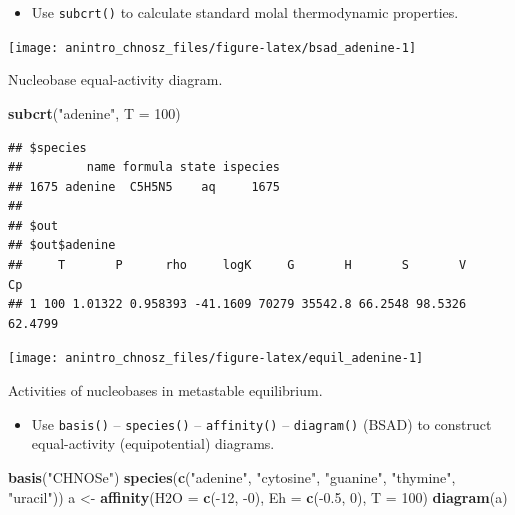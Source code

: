 \documentclass[]{tufte-book}
\newenvironment{Shaded}{}{}
\newcommand{\KeywordTok}[1]{\textcolor[rgb]{0.00,0.44,0.13}{\textbf{#1}}}
\newcommand{\DataTypeTok}[1]{\textcolor[rgb]{0.56,0.13,0.00}{#1}}
\newcommand{\DecValTok}[1]{\textcolor[rgb]{0.25,0.63,0.44}{#1}}
\newcommand{\FloatTok}[1]{\textcolor[rgb]{0.25,0.63,0.44}{#1}}
\newcommand{\StringTok}[1]{\textcolor[rgb]{0.25,0.44,0.63}{#1}}
\newcommand{\OperatorTok}[1]{\textcolor[rgb]{0.40,0.40,0.40}{#1}}
\newcommand{\NormalTok}[1]{#1}
\providecommand{\tightlist}{%
  \setlength{\itemsep}{0pt}\setlength{\parskip}{0pt}}
\begin{document}
\begin{itemize}
\tightlist
\item
  Use {\texttt{subcrt()}} to calculate standard molal thermodynamic
  properties.
\end{itemize}

\begin{marginfigure}
\texttt{[image: anintro\_chnosz\_files/figure-latex/bsad\_adenine-1]} \caption[Nucleobase equal-activity diagram]{Nucleobase equal-activity diagram.}\label{fig:bsad_adenine}
\end{marginfigure}

\begin{Shaded}
\begin{Highlighting}[]
\KeywordTok{subcrt}\NormalTok{(}\StringTok{"adenine"}\NormalTok{, }\DataTypeTok{T =} \DecValTok{100}\NormalTok{)}
\end{Highlighting}
\end{Shaded}

\begin{verbatim}
## $species
##         name formula state ispecies
## 1675 adenine  C5H5N5    aq     1675
## 
## $out
## $out$adenine
##     T       P      rho     logK     G       H       S       V      Cp
## 1 100 1.01322 0.958393 -41.1609 70279 35542.8 66.2548 98.5326 62.4799
\end{verbatim}

\begin{marginfigure}
\texttt{[image: anintro\_chnosz\_files/figure-latex/equil\_adenine-1]} \caption[Activities of nucleobases in metastable equilibrium]{Activities of nucleobases in metastable equilibrium.}\label{fig:equil_adenine}
\end{marginfigure}

\begin{itemize}
\tightlist
\item
  Use {\texttt{basis()}} -- {\texttt{species()}} --
  {\texttt{affinity()}} -- {\texttt{diagram()}} (BSAD) to construct
  equal-activity (equipotential) diagrams.
\end{itemize}

\begin{Shaded}
\begin{Highlighting}[]
\KeywordTok{basis}\NormalTok{(}\StringTok{"CHNOSe"}\NormalTok{)}
\KeywordTok{species}\NormalTok{(}\KeywordTok{c}\NormalTok{(}\StringTok{"adenine"}\NormalTok{, }\StringTok{"cytosine"}\NormalTok{, }\StringTok{"guanine"}\NormalTok{, }\StringTok{"thymine"}\NormalTok{, }\StringTok{"uracil"}\NormalTok{))}
\NormalTok{a <-}\StringTok{ }\KeywordTok{affinity}\NormalTok{(}\DataTypeTok{H2O =} \KeywordTok{c}\NormalTok{(}\OperatorTok{-}\DecValTok{12}\NormalTok{, }\OperatorTok{-}\DecValTok{0}\NormalTok{), }\DataTypeTok{Eh =} \KeywordTok{c}\NormalTok{(}\OperatorTok{-}\FloatTok{0.5}\NormalTok{, }\DecValTok{0}\NormalTok{), }\DataTypeTok{T =} \DecValTok{100}\NormalTok{)}
\KeywordTok{diagram}\NormalTok{(a)}
\end{Highlighting}
\end{Shaded}
\end{document}
